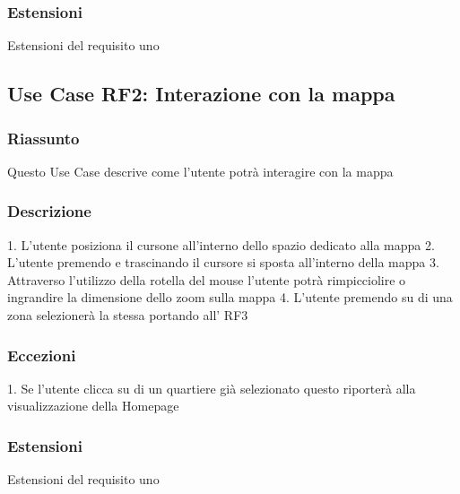         \subsubsection{Estensioni}
            Estensioni del requisito uno
    \subsection{Use Case {RF2}: Interazione con la mappa}
        \subsubsection{Riassunto}
            Questo Use Case descrive come l'utente potrà interagire con la mappa
        \subsubsection{Descrizione}
            1. L'utente posiziona il cursone all'interno dello spazio dedicato alla mappa
            2. L'utente premendo e trascinando il cursore si sposta all'interno della mappa
            3. Attraverso l'utilizzo della rotella del mouse l'utente potrà rimpicciolire o ingrandire la dimensione dello zoom sulla mappa
            4. L'utente premendo su di una zona selezionerà la stessa portando all' RF3
        \subsubsection{Eccezioni}
            1. Se l'utente clicca su di un quartiere già selezionato questo riporterà alla visualizzazione della Homepage
        \subsubsection{Estensioni}
            Estensioni del requisito uno    %
